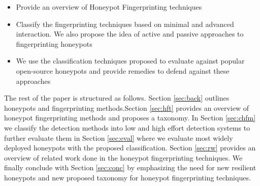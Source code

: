  \begin{itemize}
    \item Provide an overview of Honeypot Fingerprinting techniques
    \item Classify the fingerprinting techniques based on minimal and advanced interaction. We also propose the idea of active and passive approaches to fingerprinting honeypots
    \item We use the classification techniques proposed to evaluate against popular open-source honeypots and provide remedies to defend against these approaches
 \end{itemize}

The rest of the paper is structured as follows. Section \ref{sec:back} outlines honeypots and fingerprinting methods.Section \ref{sec:hft} provides an overview of honeypot fingerprinting methods and proposes a taxonomy. In Section \ref{sec:chfm} we classify the detection methods into low and high effort detection systems to further evaluate them in Section \ref{sec:eval} where we evaluate most widely deployed honeypots with the proposed classification. Section \ref{sec:rw} provides an overview of related work done in the honeypot fingerprinting techniques. We finally conclude with Section \ref{sec:conc} by emphasizing the need for new resilient honeypots and new proposed taxonomy for honeypot fingerprinting techniques.